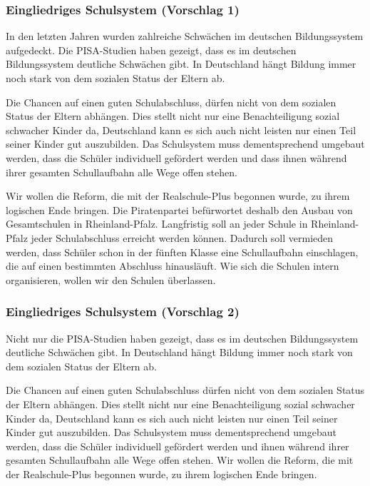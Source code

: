 \newpage
{}\label{wp:bildung:eingliedrig}

\subsubsection{Eingliedriges Schulsystem (Vorschlag 1)}
\abstimmung
In den letzten Jahren wurden zahlreiche Schwächen im deutschen Bildungssystem aufgedeckt. Die PISA-Studien haben gezeigt, dass es im deutschen Bildungssystem deutliche Schwächen gibt. In Deutschland hängt Bildung immer noch stark von dem sozialen Status der Eltern ab.

Die Chancen auf einen guten Schulabschluss, dürfen nicht von dem sozialen Status der Eltern abhängen. Dies stellt nicht nur eine Benachteiligung sozial schwacher Kinder da, Deutschland kann es sich auch nicht leisten nur einen Teil seiner Kinder gut auszubilden. Das Schulsystem muss dementsprechend umgebaut werden, dass die Schüler individuell gefördert werden und dass ihnen während ihrer gesamten Schullaufbahn alle Wege offen stehen.

Wir wollen die Reform, die mit der Realschule-Plus begonnen wurde, zu ihrem logischen Ende bringen. Die Piratenpartei befürwortet deshalb den Ausbau von Gesamtschulen in Rheinland-Pfalz. Langfristig soll an jeder Schule in Rheinland-Pfalz jeder Schulabschluss erreicht werden können. Dadurch soll vermieden werden, dass Schüler schon in der fünften Klasse eine Schullaufbahn einschlagen, die auf einen bestimmten Abschluss hinausläuft. Wie sich die Schulen intern organisieren, wollen wir den Schulen überlassen.

\subsubsection{Eingliedriges Schulsystem (Vorschlag 2)}
\abstimmung
Nicht nur die PISA-Studien haben gezeigt, dass es im deutschen Bildungssystem deutliche Schwächen gibt. In Deutschland hängt Bildung immer noch stark von dem sozialen Status der Eltern ab.

Die Chancen auf einen guten Schulabschluss dürfen nicht von dem sozialen Status der Eltern abhängen. Dies stellt nicht nur eine Benachteiligung sozial schwacher Kinder da, Deutschland kann es sich auch nicht leisten nur einen Teil seiner Kinder gut auszubilden. Das Schulsystem muss dementsprechend umgebaut werden, dass die Schüler individuell gefördert werden und ihnen während ihrer gesamten Schullaufbahn alle Wege offen stehen. Wir wollen die Reform, die mit der Realschule-Plus begonnen wurde, zu ihrem logischen Ende bringen.

